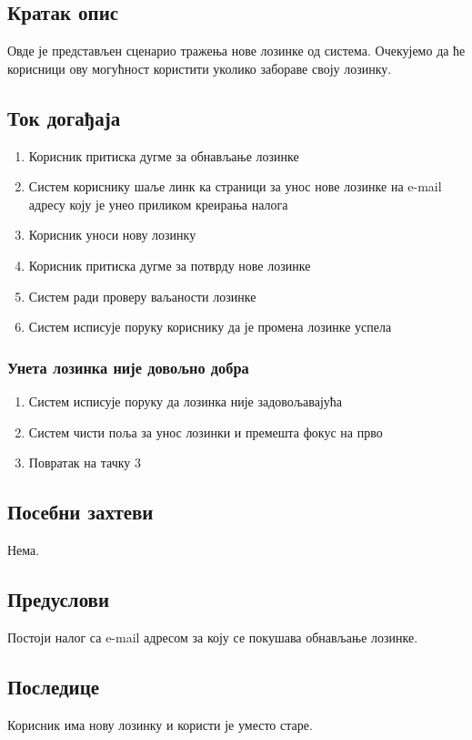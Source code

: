 \subsection{Кратак опис}
Овде је представљен сценарио тражења нове лозинке од система. Очекујемо да ће корисници ову
могућност користити уколико забораве своју лозинку.

\subsection{Ток догађаја}
\begin{enumerate}
	\item Корисник притиска дугме за обнављање лозинке
	\item Систем кориснику шаље линк ка страници за унос нове лозинке на e-mail адресу коју је
	      унео приликом креирања налога
	\item Корисник уноси нову лозинку
	\item Корисник притиска дугме за потврду нове лозинке
	\item Систем ради проверу ваљаности лозинке
	\item Систем исписује поруку кориснику да је промена лозинке успела
\end{enumerate}

\subsubsection{Унета лозинка није довољно добра}
\begin{enumerate}[label=5.\arabic*]
	\item Систем исписује поруку да лозинка није задовољавајућа
	\item Систем чисти поља за унос лозинки и премешта фокус на прво
	\item Повратак на тачку 3
\end{enumerate}

\subsection{Посебни захтеви}
Нема.

\subsection{Предуслови}
Постоји налог са e-mail адресом за коју се покушава обнављање лозинке.

\subsection{Последице}
Корисник има нову лозинку и користи је уместо старе.
